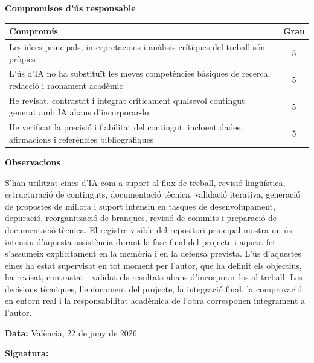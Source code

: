 \textbf{Compromisos d'ús responsable}

\begin{center}
\begin{tabular}{p{}c}
\hline
\textbf{Compromís} & \textbf{Grau} \\
\hline
Les idees principals, interpretacions i anàlisis crítiques del treball són pròpies & 5 \\
L'ús d'IA no ha substituït les meves competències bàsiques de recerca, redacció i raonament acadèmic & 5 \\
He revisat, contrastat i integrat críticament qualsevol contingut generat amb IA abans d'incorporar-lo & 5 \\
He verificat la precisió i fiabilitat del contingut, incloent dades, afirmacions i referències bibliogràfiques & 5 \\
\hline
\end{tabular}
\end{center}

\textbf{Observacions}

S’han utilitzat eines d’IA com a suport al flux de treball, revisió lingüística, estructuració de continguts, documentació tècnica, validació iterativa, generació de propostes de millora i suport intensiu en tasques de desenvolupament, depuració, reorganització de branques, revisió de commits i preparació de documentació tècnica. El registre visible del repositori principal mostra un ús intensiu d’aquesta assistència durant la fase final del projecte i aquest fet s’assumeix explícitament en la memòria i en la defensa prevista. L’ús d’aquestes eines ha estat supervisat en tot moment per l’autor, que ha definit els objectius, ha revisat, contrastat i validat els resultats abans d’incorporar-los al treball. Les decisions tècniques, l’enfocament del projecte, la integració final, la comprovació en entorn real i la responsabilitat acadèmica de l’obra corresponen íntegrament a l’autor.

\vspace{2em}

\noindent\textbf{Data:} València, 22 de juny de 2026

\vspace{4em}

\noindent\textbf{Signatura:}

\vspace{3em}

\noindent\underline{\hspace{8cm}}

